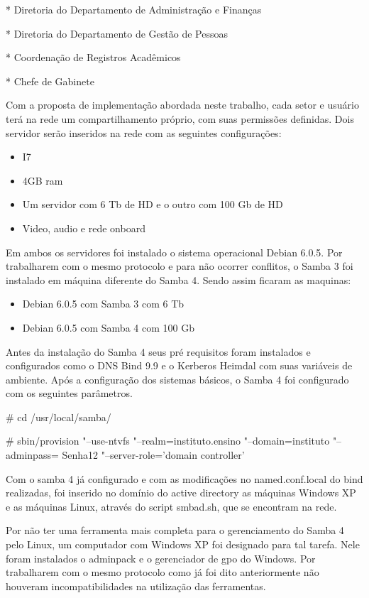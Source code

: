* Diretoria do Departamento de Administração e Finanças

* Diretoria do Departamento de Gestão de Pessoas

* Coordenação de Registros Acadêmicos

* Chefe de Gabinete

Com a proposta de implementação abordada neste trabalho, cada setor e usuário terá na rede um compartilhamento próprio, com suas permissões definidas. Dois servidor serão inseridos na rede com as seguintes configurações:

\begin{itemize}
	\item{I7}
	\item{4GB ram}
	\item{Um servidor com 6 Tb de HD e o outro com 100 Gb de HD}
	\item{Video, audio e rede onboard}
\end{itemize}

Em ambos os servidores foi instalado o sistema operacional Debian 6.0.5. Por trabalharem com o mesmo protocolo e para não ocorrer conflitos, o Samba 3 foi instalado em máquina diferente do Samba 4. Sendo assim ficaram as maquinas:

\begin{itemize}
	\item{Debian 6.0.5 com Samba 3 com 6 Tb}
	\item{Debian 6.0.5 com Samba 4 com 100 Gb}
\end{itemize}

Antes da instalação do Samba 4 seus pré requisitos foram instalados e configurados como o DNS Bind 9.9 e o Kerberos Heimdal com suas variáveis de ambiente.
Após a configuração dos sistemas básicos, o Samba 4 foi configurado com os seguintes parâmetros.

\# cd /usr/local/samba/

\# sbin/provision "--use-ntvfs "--realm=instituto.ensino "--domain=instituto "--adminpass= Senha12 "--server-role=’domain controller’

Com o samba 4 já configurado e com as modificações no named.conf.local do bind realizadas, foi inserido no domínio do active directory  as máquinas Windows XP e as máquinas Linux, através do script smbad.sh, que se encontram na rede.

Por não ter uma ferramenta mais completa para o gerenciamento do Samba 4 pelo Linux, um computador com Windows XP foi designado para tal tarefa. Nele foram instalados o adminpack e o gerenciador de gpo do Windows. Por trabalharem com o mesmo protocolo como já foi dito anteriormente não houveram incompatibilidades na utilização das ferramentas.

